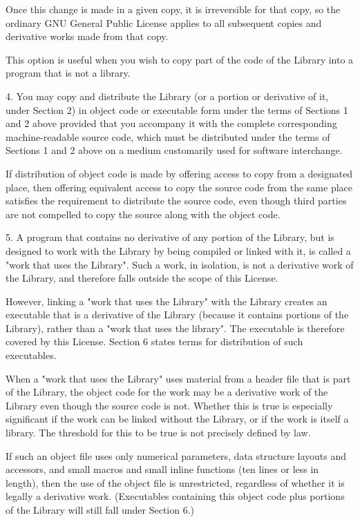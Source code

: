 Once this change is made in a given copy, it is irreversible for that copy, so the ordinary GNU General Public License applies to all subsequent copies and derivative works made from that copy.

This option is useful when you wish to copy part of the code of the Library into a program that is not a library.

4. You may copy and distribute the Library (or a portion or derivative of it, under Section 2) in object code or executable form under the terms of Sections 1 and 2 above provided that you accompany it with the complete corresponding machine-readable source code, which must be distributed under the terms of Sections 1 and 2 above on a medium customarily used for software interchange.

If distribution of object code is made by offering access to copy from a designated place, then offering equivalent access to copy the source code from the same place satisfies the requirement to distribute the source code, even though third parties are not compelled to copy the source along with the object code.

5. A program that contains no derivative of any portion of the Library, but is designed to work with the Library by being compiled or linked with it, is called a "work that uses the Library". Such a work, in isolation, is not a derivative work of the Library, and therefore falls outside the scope of this License.

However, linking a "work that uses the Library" with the Library creates an executable that is a derivative of the Library (because it contains portions of the Library), rather than a "work that uses the library". The executable is therefore covered by this License. Section 6 states terms for distribution of such executables.

When a "work that uses the Library" uses material from a header file that is part of the Library, the object code for the work may be a derivative work of the Library even though the source code is not. Whether this is true is especially significant if the work can be linked without the Library, or if the work is itself a library. The threshold for this to be true is not precisely defined by law.

If such an object file uses only numerical parameters, data structure layouts and accessors, and small macros and small inline functions (ten lines or less in length), then the use of the object file is unrestricted, regardless of whether it is legally a derivative work. (Executables containing this object code plus portions of the Library will still fall under Section 6.)

